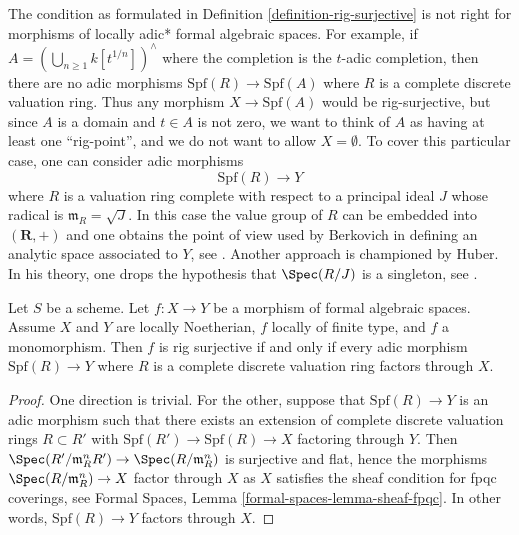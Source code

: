 \begin{remark}
\label{remark-rig-surjective-more-general}
The condition as formulated in Definition \ref{definition-rig-surjective}
is not right for morphisms of locally adic* formal algebraic spaces.
For example, if $A = (\bigcup_{n \geq 1} k[t^{1/n}])^\wedge$
where the completion is the $t$-adic completion, then
there are no adic morphisms $\text{Spf}(R) \to \text{Spf}(A)$
where $R$ is a complete discrete valuation ring.
Thus any morphism $X \to \text{Spf}(A)$ would be rig-surjective,
but since $A$ is a domain and $t \in A$ is not zero, we want to
think of $A$ as having at least one ``rig-point'', and we do not
want to allow $X = \emptyset$. To cover this
particular case, one can consider adic morphisms
$$
\text{Spf}(R) \longrightarrow Y
$$
where $R$ is a valuation ring complete with respect to a principal
ideal $J$ whose radical is $\mathfrak m_R = \sqrt{J}$.
In this case the value group of $R$ can be embedded into
$(\mathbf{R}, +)$ and one obtains the point of view used by
Berkovich in defining an analytic space associated to $Y$, see
\cite{Berkovich}. Another approach is championed by Huber. In his theory,
one drops the hypothesis that $\Spec(R/J)$ is a singleton, see
\cite{Huber-continuous-valuations}.
\end{remark}

\begin{lemma}
\label{lemma-monomorphism-rig-surjective}
Let $S$ be a scheme. Let $f : X \to Y$ be a morphism of formal algebraic
spaces. Assume $X$ and $Y$ are locally Noetherian, $f$ locally of finite
type, and $f$ a monomorphism. Then $f$ is rig surjective if and only if
every adic morphism $\text{Spf}(R) \to Y$ where $R$ is a complete discrete
valuation ring factors through $X$.
\end{lemma}

\begin{proof}
One direction is trivial. For the other, suppose that $\text{Spf}(R) \to Y$
is an adic morphism such that there exists an extension of complete
discrete valuation rings $R \subset R'$ with
$\text{Spf}(R') \to \text{Spf}(R) \to X$ factoring through $Y$. Then
$\Spec(R'/\mathfrak m_R^n R') \to \Spec(R/\mathfrak m_R^n)$ is surjective
and flat, hence the morphisms $\Spec(R/\mathfrak m_R^n) \to X$ factor
through $X$ as $X$ satisfies the sheaf condition for fpqc coverings, see
Formal Spaces, Lemma \ref{formal-spaces-lemma-sheaf-fpqc}.
In other words, $\text{Spf}(R) \to Y$ factors through $X$.
\end{proof}





